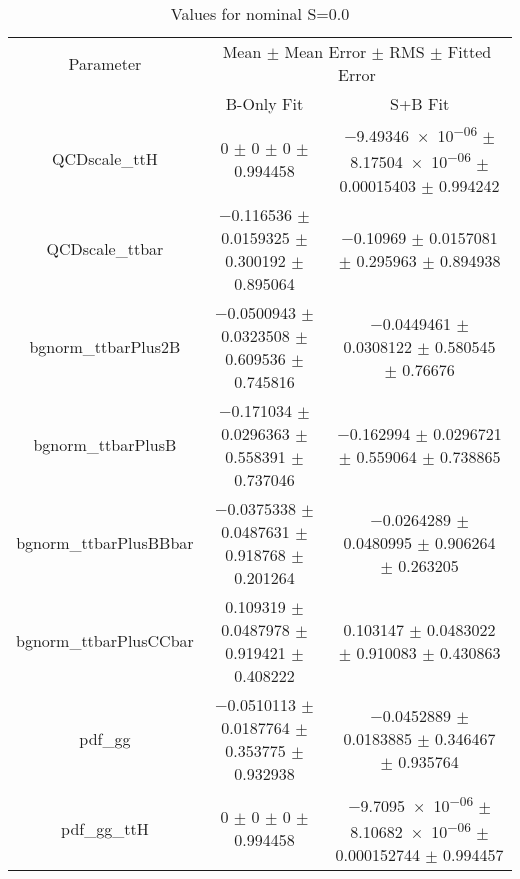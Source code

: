 \begin{table}
\centering
\caption{Values for nominal S=0.0}
\begin{tabular}{ccc}
\toprule
Parameter & \multicolumn{2}{c}{Mean $\pm$ Mean Error $\pm$ RMS $\pm$ Fitted Error}\\
 & B-Only Fit & S+B Fit\\
\midrule
QCDscale\_ttH & \num{0} $\pm$ \num{0} $\pm$ \num{0} $\pm$ \num{0.994458} & \num{-9.49346e-06} $\pm$ \num{8.17504e-06} $\pm$ \num{0.00015403} $\pm$ \num{0.994242}\\
QCDscale\_ttbar & \num{-0.116536} $\pm$ \num{0.0159325} $\pm$ \num{0.300192} $\pm$ \num{0.895064} & \num{-0.10969} $\pm$ \num{0.0157081} $\pm$ \num{0.295963} $\pm$ \num{0.894938}\\
bgnorm\_ttbarPlus2B & \num{-0.0500943} $\pm$ \num{0.0323508} $\pm$ \num{0.609536} $\pm$ \num{0.745816} & \num{-0.0449461} $\pm$ \num{0.0308122} $\pm$ \num{0.580545} $\pm$ \num{0.76676}\\
bgnorm\_ttbarPlusB & \num{-0.171034} $\pm$ \num{0.0296363} $\pm$ \num{0.558391} $\pm$ \num{0.737046} & \num{-0.162994} $\pm$ \num{0.0296721} $\pm$ \num{0.559064} $\pm$ \num{0.738865}\\
bgnorm\_ttbarPlusBBbar & \num{-0.0375338} $\pm$ \num{0.0487631} $\pm$ \num{0.918768} $\pm$ \num{0.201264} & \num{-0.0264289} $\pm$ \num{0.0480995} $\pm$ \num{0.906264} $\pm$ \num{0.263205}\\
bgnorm\_ttbarPlusCCbar & \num{0.109319} $\pm$ \num{0.0487978} $\pm$ \num{0.919421} $\pm$ \num{0.408222} & \num{0.103147} $\pm$ \num{0.0483022} $\pm$ \num{0.910083} $\pm$ \num{0.430863}\\
pdf\_gg & \num{-0.0510113} $\pm$ \num{0.0187764} $\pm$ \num{0.353775} $\pm$ \num{0.932938} & \num{-0.0452889} $\pm$ \num{0.0183885} $\pm$ \num{0.346467} $\pm$ \num{0.935764}\\
pdf\_gg\_ttH & \num{0} $\pm$ \num{0} $\pm$ \num{0} $\pm$ \num{0.994458} & \num{-9.7095e-06} $\pm$ \num{8.10682e-06} $\pm$ \num{0.000152744} $\pm$ \num{0.994457}\\
\bottomrule
\end{tabular}
\end{table}